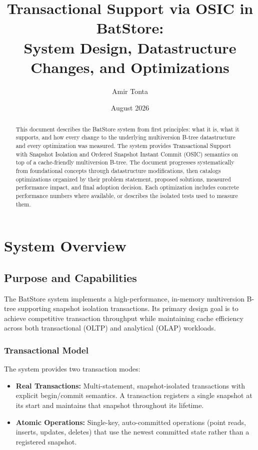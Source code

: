 \documentclass[11pt]{article}
\title{Transactional Support via OSIC in BatStore: \\
  System Design, Datastructure Changes, and Optimizations}
\author{Amir Tonta}
\date{August 2026}
\begin{document}
\maketitle

\begin{abstract}
This document describes the BatStore system from first principles: what it is, what it supports,
and how every change to the underlying multiversion B-tree datastructure and every optimization was
measured. The system provides Transactional Support with Snapshot Isolation and Ordered Snapshot
Instant Commit (OSIC) semantics on top of a cache-friendly multiversion B-tree. The document
progresses systematically from foundational concepts through datastructure modifications, then
catalogs optimizations organized by their problem statement, proposed solutions, measured
performance impact, and final adoption decision. Each optimization includes concrete performance
numbers where available, or describes the isolated tests used to measure them.
\end{abstract}

\tableofcontents

\newpage

\section{System Overview}
\label{sec:overview}

\subsection{Purpose and Capabilities}

The BatStore system implements a high-performance, in-memory multiversion B-tree supporting
snapshot isolation transactions. Its primary design goal is to achieve competitive transaction
throughput while maintaining cache efficiency across both transactional (OLTP) and analytical
(OLAP) workloads.

\subsubsection{Transactional Model}

The system provides two transaction modes:

\begin{itemize}
  \item \textbf{Real Transactions:} Multi-statement, snapshot-isolated transactions with
        explicit begin/commit semantics. A transaction registers a single snapshot at its
        start and maintains that snapshot throughout its lifetime.

  \item \textbf{Atomic Operations:} Single-key, auto-committed operations (point reads,
        inserts, updates, deletes) that use the newest committed state rather than a
        registered snapshot.
\end{itemize}
\end{document}

